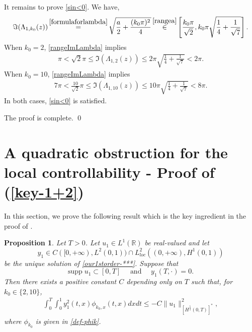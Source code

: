\documentclass[11pt, reqno]{amsart}
\theoremstyle{plain}
\newtheorem{proposition}[thm]{Proposition}
\numberwithin{equation}{section}
\newcommand{\mR}{\mathbb{R}}
\begin{document}
It remains to prove \eqref{sin<0}. We have, 
    \begin{align}	\label{rangeImLambda}
        \Im (\Lambda_{1,k_0}(z)) \mathop{=}^{\Cref{formulaforlambda}} \sqrt{\frac{a}{2} + \frac{({k_0} \pi)^2}{4} } \mathop{\in}^{\eqref{rangea}} \left[\frac{{k_0} \pi}{\sqrt{2}}, {k_0} \pi \sqrt{\frac{1}{4} + \frac{1}{\sqrt{7}}} \right].
    \end{align}
    When ${k_0} = 2$, \eqref{rangeImLambda} implies
\begin{align*}
	\pi < \sqrt{2} \pi \leq \Im(\Lambda_{1,2}(z)) \leq 2 \pi \sqrt{\frac{1}{4} + \frac{1}{\sqrt{7}}} < 2 \pi.
\end{align*}        
      When ${k_0} = 10$, \eqref{rangeImLambda} implies
        \begin{align*}
        7 \pi < \frac{10}{\sqrt{2}} \pi \leq \Im(\Lambda_{1,10}(z)) \leq 10 \pi \sqrt{\frac{1}{4} + \frac{1}{\sqrt{7}}} < 8 \pi.
        \end{align*}
In both cases, \eqref{sin<0} is satisfied. 

The proof is complete. \qed
    





\section{A quadratic obstruction for the local controllability - Proof of (\ref{key-1+2})} \label{sect-obstruction}

In this section, we prove the following result which is the key ingredient in the proof of . 
 
  
\begin{proposition} \label{2obstruction}
Let $T > 0$. Let $u_1 \in L^1(\mR)$ be real-valued and let $$y_1 \in C([0, +\infty), L^2(0, 1)) \cap L^2_{loc}((0, +\infty), H^1(0, 1))$$ be the unique solution of \eqref{our1storder-***}. 
Suppose that 
$$
\mathrm{supp} \; u_1 \subset [0, T] \quad \mbox{ and } \quad  y_1(T, \cdot) = 0.
$$ 
Then there exists a positive constant $C$ depending only on $T$ such that, for $k_0 \in \{2, 10\}$,
\begin{align}	\label{key1+2}
 \int_0^T \int_0^1 y_1^2(t, x) \phi_{k_0, x}(t, x) dx dt \leq  - C \|u_1\|^2_{[H^{\frac{5}{4}}(0, T)]^*}, 
\end{align}
where $\phi_{k_0}$ is given in \eqref{def-phik}.
\end{proposition} 
\end{document}
